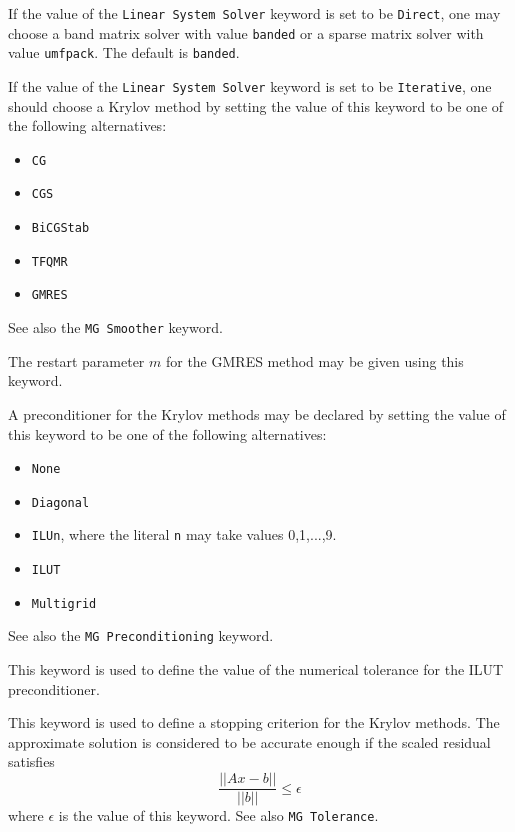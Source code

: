If the value of the {\tt Linear System Solver} keyword is set to be 
{\tt Direct}, one may choose a band matrix solver with 
value \texttt{banded} or a sparse matrix solver with 
value \texttt{umfpack}. The default is \texttt{banded}.

If the value of the {\tt Linear System Solver} keyword is set to be 
{\tt Iterative}, one should choose a Krylov method by setting the value of this keyword to be 
one of the following alternatives:
\begin{itemize}
\item {\tt CG}
\item {\tt CGS}
\item {\tt BiCGStab}
\item {\tt TFQMR}
\item {\tt GMRES}
\end{itemize}
See also the {\tt MG Smoother} keyword.

The restart parameter $m$ for the GMRES method may be given using this keyword.

A preconditioner for the Krylov methods may be declared by setting the value of this keyword to be 
one of the following alternatives: 
\begin{itemize}
\item {\tt None}
\item {\tt Diagonal}
\item {\tt ILUn}, where the literal {\tt n} may take values 0,1,...,9.
\item {\tt ILUT}
\item {\tt Multigrid}
\end{itemize}
See also the {\tt MG Preconditioning} keyword.


This keyword is used to define the value of 
the numerical tolerance for the ILUT preconditioner.

This keyword is used to define a stopping criterion for the Krylov methods. 
The approximate solution is considered to be accurate enough if the scaled residual satisfies
\begin{equation*}
\frac{|| Ax - b ||}{||b||} \le \epsilon
\end{equation*}
where $\epsilon$ is the value of this keyword.
See also {\tt MG Tolerance}.

